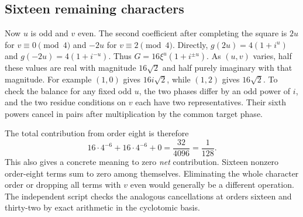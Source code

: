 \documentclass[12pt,letterpaper]{article}
\begin{document}
\subsection{Sixteen remaining characters}
Now $u$ is odd and $v$ even. The second coefficient after completing the square is $2u$ for $v\equiv0\pmod4$ and $-2u$ for $v\equiv2\pmod4$. Directly, $g(2u)=4(1+i^u)$ and $g(-2u)=4(1+i^{-u})$. Thus $G=16\xi^u(1+i^{\pm u})$. As $(u,v)$ varies, half these values are real with magnitude $16\sqrt2$ and half purely imaginary with that magnitude. For example $(1,0)$ gives $16i\sqrt2$, while $(1,2)$ gives $16\sqrt2$. To check the balance for any fixed odd $u$, the two phases differ by an odd power of $i$, and the two residue conditions on $v$ each have two representatives. Their sixth powers cancel in pairs after multiplication by the common target phase.
\par
The total contribution from order eight is therefore
\[
        16\cdot4^{-6}+16\cdot4^{-6}+0=\frac{32}{4096}=\frac1{128}.
\]
This also gives a concrete meaning to zero \emph{net} contribution. Sixteen nonzero order-eight terms sum to zero among themselves. Eliminating the whole character order or dropping all terms with $v$ even would generally be a different operation. The independent script checks the analogous cancellations at orders sixteen and thirty-two by exact arithmetic in the cyclotomic basis.
\end{document}
